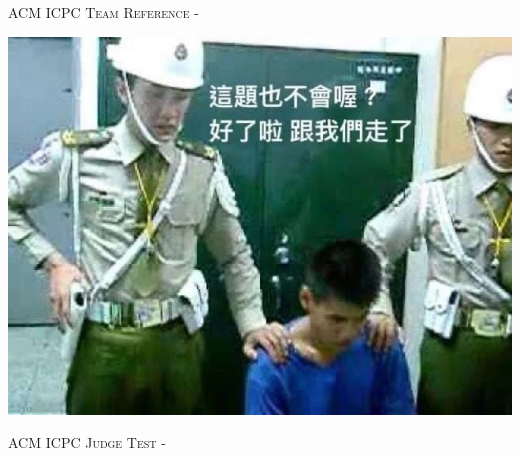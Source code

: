 \documentclass[a4paper,10pt,oneside]{article}
\begin{document}

  \begin{multicols}{\NumberOfColumn}
    \pagestyle{fancy}

    \fancyfoot{}
    \fancyhead[L]{\UniversityName{} - \TeamName}
    \fancyhead[R]{\thepage}

    \renewcommand{\headrulewidth}{0.4pt}
    \renewcommand{\contentsname}{Contents}

    \scriptsize
    
    \clearpage
  \end{multicols}
  \newpage
  \begin{multicols}{\NumberOfColumn}
    \enlargethispage*{\baselineskip}
    \begin{center}
      \Huge\textsc{ACM ICPC Team Reference - \TeamName}
      \vspace{0.35cm}
    \end{center}
    \tableofcontents
  \end{multicols}
  \clearpage

  \includegraphics[width = 10 cm]{"cover.jpeg"}

  \begin{multicols}{\NumberOfColumn}
    \begin{center}
      \Huge\textsc{ACM ICPC Judge Test - \TeamName}
      \vspace{0.35cm}
    \end{center}
    \scriptsize
    
  \end{multicols}
\end{document}
